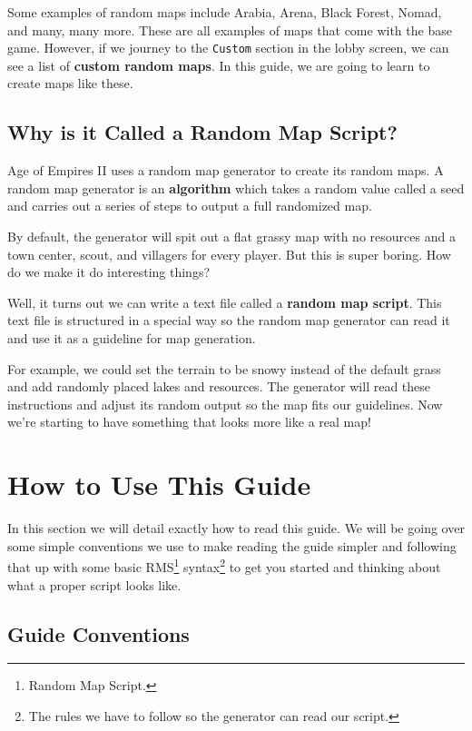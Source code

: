 \documentclass[]{article}
\let\rmarkdownfootnote\footnote%
\def\footnote{\protect\rmarkdownfootnote}
\theoremstyle{plain}
\theoremstyle{remark}
\theoremstyle{definition}
\begin{document}
Some examples of random maps include Arabia, Arena, Black Forest, Nomad,
and many, many more. These are all examples of maps that come with the
base game. However, if we journey to the \texttt{Custom} section in the
lobby screen, we can see a list of \textbf{custom random maps}. In this
guide, we are going to learn to create maps like these.

\hypertarget{why-is-it-called-a-random-map-script}{%
\subsection{Why is it Called a Random Map
Script?}\label{why-is-it-called-a-random-map-script}}

Age of Empires II uses a random map generator to create its random maps.
A random map generator is an \textbf{algorithm} which takes a random
value called a seed and carries out a series of steps to output a full
randomized map.

By default, the generator will spit out a flat grassy map with no
resources and a town center, scout, and villagers for every player. But
this is super boring. How do we make it do interesting things?

Well, it turns out we can write a text file called a \textbf{random map
script}. This text file is structured in a special way so the random map
generator can read it and use it as a guideline for map generation.

For example, we could set the terrain to be snowy instead of the default
grass and add randomly placed lakes and resources. The generator will
read these instructions and adjust its random output so the map fits our
guidelines. Now we're starting to have something that looks more like a
real map!

\hypertarget{how-to-use-this-guide}{%
\section{How to Use This Guide}\label{how-to-use-this-guide}}

In this section we will detail exactly how to read this guide. We will
be going over some simple conventions we use to make reading the guide
simpler and following that up with some basic
RMS\footnote{Random Map Script.} syntax\footnote{The rules we have to
follow so the generator can read our script.} to get you started and
thinking about what a proper script looks like.

\hypertarget{guide-conventions}{%
\subsection{Guide Conventions}\label{guide-conventions}}
\end{document}
